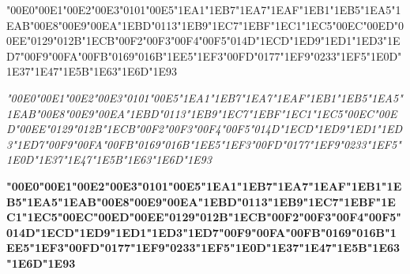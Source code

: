 {\LibertinusSerifPatch
	\char"00E0\gs \char"00E1\gs \char"00E2\gs \char"00E3\gs \char"0101\gs \char"00E5\gs \char"1EA1\gs \char"1EB7\gs \char"1EA7\gs \char"1EAF\gs \char"1EB1\gs \char"1EB5\gs \char"1EA5\gs \char"1EAB\gs \char"00E8\gs \char"00E9\gs \char"00EA\gs \char"1EBD\gs \char"0113\gs \char"1EB9\gs \char"1EC7\gs \char"1EBF\gs \char"1EC1\gs \char"1EC5\gs \char"00EC\gs \char"00ED\gs \char"00EE\gs \char"0129\gs \char"012B\gs \char"1ECB\gs \char"00F2\gs \char"00F3\gs \char"00F4\gs \char"00F5\gs \char"014D\gs \char"1ECD\gs \char"1ED9\gs \char"1ED1\gs \char"1ED3\gs \char"1ED7\gs \char"00F9\gs \char"00FA\gs \char"00FB\gs \char"0169\gs \char"016B\gs \char"1EE5\gs \char"1EF3\gs \char"00FD\gs \char"0177\gs \char"1EF9\gs \char"0233\gs \char"1EF5\gs \char"1E0D\gs \char"1E37\gs \char"1E47\gs \char"1E5B\gs \char"1E63\gs \char"1E6D\gs \char"1E93\gs
}

{\LibertinusSerifPatch\itshape 
	\char"00E0\gs \char"00E1\gs \char"00E2\gs \char"00E3\gs \char"0101\gs \char"00E5\gs \char"1EA1\gs \char"1EB7\gs \char"1EA7\gs \char"1EAF\gs \char"1EB1\gs \char"1EB5\gs \char"1EA5\gs \char"1EAB\gs \char"00E8\gs \char"00E9\gs \char"00EA\gs \char"1EBD\gs \char"0113\gs \char"1EB9\gs \char"1EC7\gs \char"1EBF\gs \char"1EC1\gs \char"1EC5\gs \char"00EC\gs \char"00ED\gs \char"00EE\gs \char"0129\gs \char"012B\gs \char"1ECB\gs \char"00F2\gs \char"00F3\gs \char"00F4\gs \char"00F5\gs \char"014D\gs \char"1ECD\gs \char"1ED9\gs \char"1ED1\gs \char"1ED3\gs \char"1ED7\gs \char"00F9\gs \char"00FA\gs \char"00FB\gs \char"0169\gs \char"016B\gs \char"1EE5\gs \char"1EF3\gs \char"00FD\gs \char"0177\gs \char"1EF9\gs \char"0233\gs \char"1EF5\gs \char"1E0D\gs \char"1E37\gs \char"1E47\gs \char"1E5B\gs \char"1E63\gs \char"1E6D\gs \char"1E93\gs
}

{\LibertinusSerifPatch\bfseries 
	\char"00E0\gs \char"00E1\gs \char"00E2\gs \char"00E3\gs \char"0101\gs \char"00E5\gs \char"1EA1\gs \char"1EB7\gs \char"1EA7\gs \char"1EAF\gs \char"1EB1\gs \char"1EB5\gs \char"1EA5\gs \char"1EAB\gs \char"00E8\gs \char"00E9\gs \char"00EA\gs \char"1EBD\gs \char"0113\gs \char"1EB9\gs \char"1EC7\gs \char"1EBF\gs \char"1EC1\gs \char"1EC5\gs \char"00EC\gs \char"00ED\gs \char"00EE\gs \char"0129\gs \char"012B\gs \char"1ECB\gs \char"00F2\gs \char"00F3\gs \char"00F4\gs \char"00F5\gs \char"014D\gs \char"1ECD\gs \char"1ED9\gs \char"1ED1\gs \char"1ED3\gs \char"1ED7\gs \char"00F9\gs \char"00FA\gs \char"00FB\gs \char"0169\gs \char"016B\gs \char"1EE5\gs \char"1EF3\gs \char"00FD\gs \char"0177\gs \char"1EF9\gs \char"0233\gs \char"1EF5\gs \char"1E0D\gs \char"1E37\gs \char"1E47\gs \char"1E5B\gs \char"1E63\gs \char"1E6D\gs \char"1E93\gs
}


